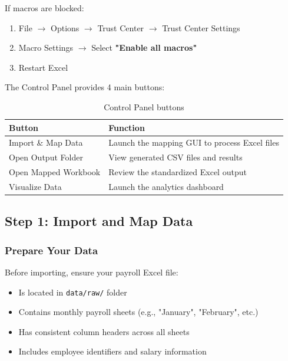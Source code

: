 \documentclass[11pt,a4paper]{article}
\begin{document}
\begin{warningbox}[title=Macro Security Settings]
If macros are blocked:
\begin{enumerate}
    \item File $\rightarrow$ Options $\rightarrow$ Trust Center $\rightarrow$ Trust Center Settings
    \item Macro Settings $\rightarrow$ Select \textbf{"Enable all macros"}
    \item Restart Excel
\end{enumerate}
\end{warningbox}

The Control Panel provides 4 main buttons:

\begin{table}[h]
\centering
\begin{tabular}{@{} l p{9cm} @{}}
\toprule
\textbf{Button} & \textbf{Function} \\
\midrule
Import \& Map Data & Launch the mapping GUI to process Excel files \\
Open Output Folder & View generated CSV files and results \\
Open Mapped Workbook & Review the standardized Excel output \\
Visualize Data & Launch the analytics dashboard \\
\bottomrule
\end{tabular}
\caption{Control Panel buttons}
\end{table}

\newpage

\subsection{Step 1: Import and Map Data}

\subsubsection{Prepare Your Data}

Before importing, ensure your payroll Excel file:

\begin{itemize}[leftmargin=*]
    \item Is located in \texttt{data/raw/} folder
    \item Contains monthly payroll sheets (e.g., "January", "February", etc.)
    \item Has consistent column headers across all sheets
    \item Includes employee identifiers and salary information
\end{itemize}
\end{document}
